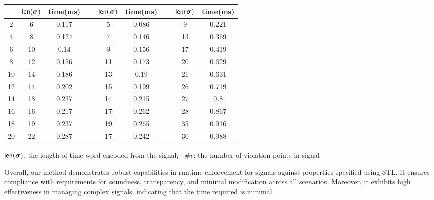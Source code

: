\begin{table*}[t]
\begin{center}
\begin{tabular}{@{}ccccccccc@{}}
                    \cmidrule{2-3} \cmidrule{5-6} \cmidrule{8-9}
                                       & $\textsf{len}(\bm{\sigma})$        & \textsf{time}(ms)       &~& $\textsf{len}(\bm{\sigma})$        & \textsf{time}(ms)         &~& $\textsf{len}(\bm{\sigma})$        & \textsf{time}(ms)          \\ \midrule
                    2                  & 6        & 0.117     &~& 5        & 0.086      &~& 9        & 0.221      \\ 
                    4                  & 8        & 0.124     &~& 7        & 0.146      &~& 13       & 0.369      \\ 
                    6                  & 10       & 0.14      &~& 9        & 0.156      &~& 17       & 0.419      \\ 
                    8                  & 12       & 0.156     &~& 11       & 0.173      &~& 20       & 0.629      \\ 
                    10                 & 14       & 0.186     &~& 13       & 0.19       &~& 21       & 0.631      \\ 
                    12                 & 14       & 0.202     &~& 15       & 0.199      &~& 26       & 0.719      \\ 
                    14                 & 18       & 0.237     &~& 14       & 0.215      &~& 27       & 0.8        \\ 
                    16                 & 16       & 0.217     &~& 17       & 0.262      &~& 28       & 0.867      \\ 
                    18                 & 19       & 0.237     &~& 19       & 0.265      &~& 35       & 0.916      \\ 
                    20                 & 22       & 0.287     &~& 17       & 0.242      &~& 30       & 0.988      \\ \bottomrule
                    \end{tabular}
            \end{center}
            \small{ 
                $\textsf{len}(\bm{\sigma})$: the length of time word encoded from the signal;~
                $\#v$: the number of violation points in signal
            } 
        \end{table*}

        Overall, our method demonstrates robust capabilities in runtime enforcement for signals against properties specified using STL. It ensures compliance with requirements for soundness, transparency, and minimal modification across all scenarios. Moreover, it exhibits high effectiveness in managing complex signals, indicating that the time required is minimal. %
        
